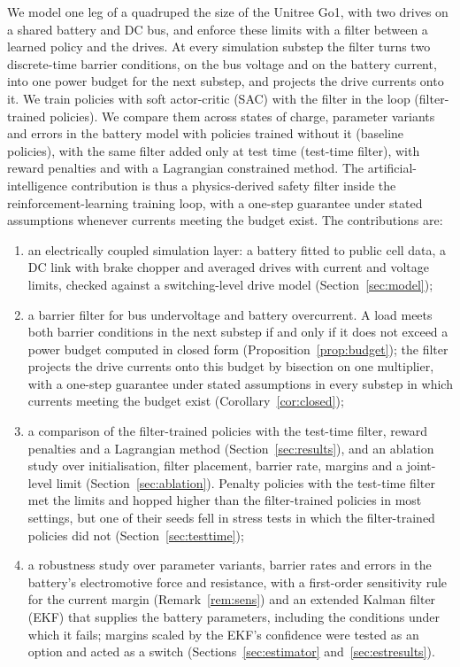 We model one leg of a quadruped the size of the Unitree Go1, with two drives on a shared battery and DC bus, and enforce these limits with a filter between a learned policy and the drives. At every simulation substep the filter turns two discrete-time barrier conditions, on the bus voltage and on the battery current, into one power budget for the next substep, and projects the drive currents onto it. We train policies with soft actor-critic (SAC) with the filter in the loop (filter-trained policies). We compare them across states of charge, parameter variants and errors in the battery model with policies trained without it (baseline policies), with the same filter added only at test time (test-time filter), with reward penalties and with a Lagrangian constrained method. The artificial-intelligence contribution is thus a physics-derived safety filter inside the reinforcement-learning training loop, with a one-step guarantee under stated assumptions whenever currents meeting the budget exist. The contributions are:
\begin{enumerate}
\item an electrically coupled simulation layer: a battery fitted to public cell data, a DC link with brake chopper and averaged drives with current and voltage limits, checked against a switching-level drive model (Section~\ref{sec:model});
\item a barrier filter for bus undervoltage and battery overcurrent. A load meets both barrier conditions in the next substep if and only if it does not exceed a power budget computed in closed form (Proposition~\ref{prop:budget}); the filter projects the drive currents onto this budget by bisection on one multiplier, with a one-step guarantee under stated assumptions in every substep in which currents meeting the budget exist (Corollary~\ref{cor:closed});
\item a comparison of the filter-trained policies with the test-time filter, reward penalties and a Lagrangian method (Section~\ref{sec:results}), and an ablation study over initialisation, filter placement, barrier rate, margins and a joint-level limit (Section~\ref{sec:ablation}). Penalty policies with the test-time filter met the limits and hopped higher than the filter-trained policies in most settings, but one of their seeds fell in stress tests in which the filter-trained policies did not (Section~\ref{sec:testtime});
\item a robustness study over parameter variants, barrier rates and errors in the battery's electromotive force and resistance, with a first-order sensitivity rule for the current margin (Remark~\ref{rem:sens}) and an extended Kalman filter (EKF) that supplies the battery parameters, including the conditions under which it fails; margins scaled by the EKF's confidence were tested as an option and acted as a switch (Sections~\ref{sec:estimator} and~\ref{sec:estresults}).
\end{enumerate}
